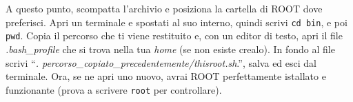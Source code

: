 A questo punto, scompatta l'archivio e posiziona la cartella di ROOT dove preferisci. Apri un terminale e spostati al suo interno, quindi scrivi \verb|cd bin|, e poi \verb|pwd|. Copia il percorso che ti viene restituito e, con un editor di testo, apri il file \emph{.bash\_profile} che si trova nella tua \emph{home} (se non esiste crealo). In fondo al file scrivi ``\emph{. percorso\_copiato\_precedentemente/thisroot.sh}.'', salva ed esci dal terminale. Ora, se ne apri uno nuovo, avrai ROOT perfettamente istallato e funzionante (prova a scrivere \verb|root| per controllare).